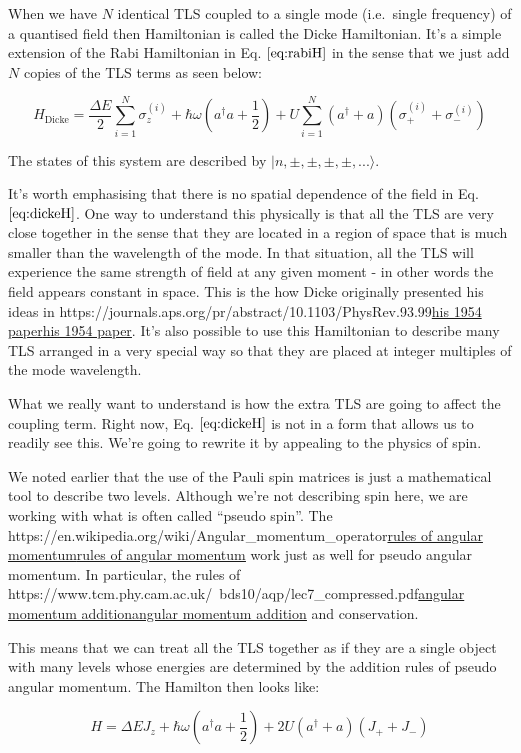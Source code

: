 \documentclass[
]{article}
\let\oldhref\href
\renewcommand{\href}[2]{\ifx#1\urlprefix\oldhref{#1}{#2}\else\uline{\oldhref{#1}{#2}}\fi}
\renewcommand{\[}{\begin{equation}}
\renewcommand{\]}{\end{equation}}
\begin{document}
When we have \(N\) identical TLS coupled to a single mode (i.e.~single
frequency) of a quantised field then Hamiltonian is called the Dicke
Hamiltonian. It's a simple extension of the Rabi Hamiltonian in Eq.
\(\ref{eq:rabiH}\) in the sense that we just add \(N\) copies of the TLS
terms as seen below:

\[
H_{\text{Dicke}} = \frac{\Delta E}{2} \sum_{i=1}^N \sigma_z^{(i)} +  \hbar\omega\left(a^{\dagger}a +\frac{1}{2}\right) + U \sum_{i=1}^N (a^\dagger + a) (\sigma_+^{(i)} + \sigma_-^{(i)})
\label{eq:dickeH}
\]

The states of this system are described by
\(|n, \pm, \pm, \pm, \pm, ... \rangle\).

It's worth emphasising that there is no spatial dependence of the field
in Eq. \(\ref{eq:dickeH}\). One way to understand this physically is
that all the TLS are very close together in the sense that they are
located in a region of space that is much smaller than the wavelength of
the mode. In that situation, all the TLS will experience the same
strength of field at any given moment - in other words the field appears
constant in space. This is the how Dicke originally presented his ideas
in \href{https://journals.aps.org/pr/abstract/10.1103/PhysRev.93.99}{his
1954 paper}. It's also possible to use this Hamiltonian to describe many
TLS arranged in a very special way so that they are placed at integer
multiples of the mode wavelength.

What we really want to understand is how the extra TLS are going to
affect the coupling term. Right now, Eq. \(\ref{eq:dickeH}\) is not in a
form that allows us to readily see this. We're going to rewrite it by
appealing to the physics of spin.

We noted earlier that the use of the Pauli spin matrices is just a
mathematical tool to describe two levels. Although we're not describing
spin here, we are working with what is often called ``pseudo spin''. The
\href{https://en.wikipedia.org/wiki/Angular_momentum_operator}{rules of
angular momentum} work just as well for pseudo angular momentum. In
particular, the rules of
\href{https://www.tcm.phy.cam.ac.uk/~bds10/aqp/lec7_compressed.pdf}{angular
momentum addition} and conservation.

This means that we can treat all the TLS together as if they are a
single object with many levels whose energies are determined by the
addition rules of pseudo angular momentum. The Hamilton then looks like:

\[
H =  \Delta E J_{z} + \hbar\omega\left(a^{\dagger}a +\frac{1}{2}\right) + 2U\left( a^{\dagger} + a \right)(J_{+} + J_{-})
\label{eq:dickeHpseudo}
\]
\end{document}
